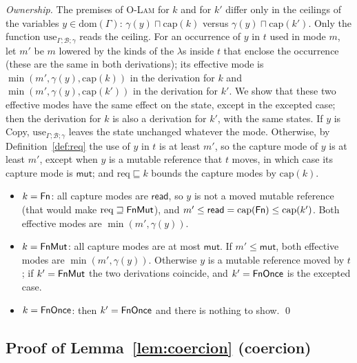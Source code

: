 \emph{Ownership.}
The premises of \textsc{O-Lam} for $k$ and for $k'$ differ only in the ceilings of the variables $y \in \mathrm{dom}(\Gamma)$: $\gamma(y) \sqcap \mathrm{cap}(k)$ versus $\gamma(y) \sqcap \mathrm{cap}(k')$.
Only the function $\mathrm{use}_{\Gamma;\mathcal{B};\gamma}$ reads the ceiling.
For an occurrence of $y$ in $t$ used in mode $m$, let $m'$ be $m$ lowered by the kinds of the $\lambda$s inside $t$ that enclose the occurrence (these are the same in both derivations); its effective mode is $\min(m', \gamma(y), \mathrm{cap}(k))$ in the derivation for $k$ and $\min(m', \gamma(y), \mathrm{cap}(k'))$ in the derivation for $k'$.
We show that these two effective modes have the same effect on the state, except in the excepted case; then the derivation for $k$ is also a derivation for $k'$, with the same states.
If $y$ is Copy, $\mathrm{use}_{\Gamma;\mathcal{B};\gamma}$ leaves the state unchanged whatever the mode.
Otherwise, by Definition~\ref{def:req} the use of $y$ in $t$ is at least $m'$, so the capture mode of $y$ is at least $m'$, except when $y$ is a mutable reference that $t$ moves, in which case its capture mode is $\mathsf{mut}$; and $\mathrm{req} \sqsubseteq k$ bounds the capture modes by $\mathrm{cap}(k)$.
\begin{itemize}\setlength\itemsep{1pt}
\item $k = \mathsf{Fn}$: all capture modes are $\mathsf{read}$, so $y$ is not a moved mutable reference (that would make $\mathrm{req} \sqsupseteq \mathsf{FnMut}$), and $m' \le \mathsf{read} = \mathrm{cap}(\mathsf{Fn}) \le \mathrm{cap}(k')$. Both effective modes are $\min(m', \gamma(y))$.
\item $k = \mathsf{FnMut}$: all capture modes are at most $\mathsf{mut}$. If $m' \le \mathsf{mut}$, both effective modes are $\min(m', \gamma(y))$. Otherwise $y$ is a mutable reference moved by $t$; if $k' = \mathsf{FnMut}$ the two derivations coincide, and $k' = \mathsf{FnOnce}$ is the excepted case.
\item $k = \mathsf{FnOnce}$: then $k' = \mathsf{FnOnce}$ and there is nothing to show. \qed
\end{itemize}

\subsection*{Proof of Lemma~\ref{lem:coercion} (coercion)}

